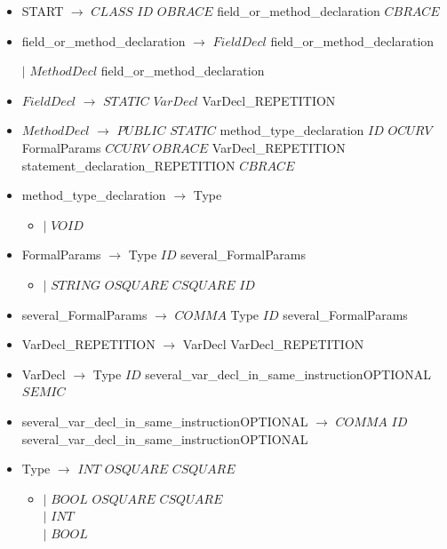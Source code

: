 \documentclass[12pt]{article}
\begin{document}
\begin{itemize}
  \item[] START $\longrightarrow$ $CLASS$ $ID$  $OBRACE$ field\_or\_method\_declaration $CBRACE$
\\
  \item[]  field\_or\_method\_declaration $\longrightarrow$  $FieldDecl$ field\_or\_method\_declaration \par$|$ $MethodDecl$  field\_or\_method\_declaration
\\   
  \item[] $FieldDecl$ $\longrightarrow$ $STATIC$ $VarDecl$  VarDecl\_REPETITION
  \\
  \item[] $MethodDecl$ $\longrightarrow$ $PUBLIC$ $STATIC$ method\_type\_declaration $ID$  $OCURV$ FormalParams $CCURV$ $OBRACE$ VarDecl\_REPETITION statement\_declaration\_REPETITION $CBRACE$
  \\
  \item[] method\_type\_declaration $\longrightarrow$ Type 
  \begin{itemize}
	\item[] $|$ $VOID$
  \end{itemize}

  \item[] FormalParams $\longrightarrow$ Type $ID$ several\_FormalParams 
  \begin{itemize}
 	\item[]$|$ $STRING$    $OSQUARE$ $CSQUARE$  $ID$  
  \end{itemize}
  
  \item[] several\_FormalParams $\longrightarrow$ $COMMA$ Type $ID$ several\_FormalParams  
  \\
  \item[] VarDecl\_REPETITION $\longrightarrow$ VarDecl VarDecl\_REPETITION 
 \\
  \item[] VarDecl $\longrightarrow$ Type $ID$ several\_var\_decl\_in\_same\_instructionOPTIONAL $SEMIC$
  \\
  \item[]several\_var\_decl\_in\_same\_instructionOPTIONAL $\longrightarrow$ $COMMA$ $ID$ several\_var\_decl\_in\_same\_instructionOPTIONAL 
  \\
  \item[]Type $\longrightarrow$ $INT$ $OSQUARE$ $CSQUARE$ 
  \begin{itemize}
  \item[]$|$ $BOOL$ $OSQUARE$ $CSQUARE$ 
  \\$|$ $INT$ 
  \\$|$ $BOOL$
  \end{itemize}
  

\end{itemize}
\end{document}
